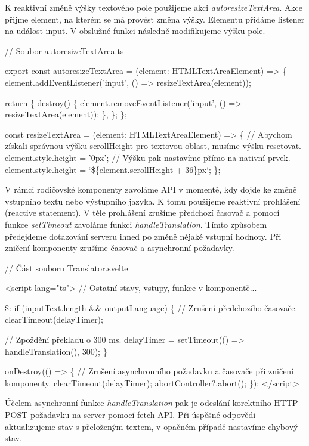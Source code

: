 K reaktivní změně výšky textového pole použijeme akci \emph{autoresizeTextArea}. Akce přijme element, na kterém se má provést změna výšky. Elementu přidáme listener na událost input. 
V obslužné funkci následně modifikujeme výšku pole.

\begin{prog}
// Soubor autoresizeTextArea.ts

export const autoresizeTextArea = (element: HTMLTextAreaElement) => \{
  element.addEventListener('input', () => resizeTextArea(element));

  return \{
    destroy() \{
      element.removeEventListener('input', () => resizeTextArea(element));
    \},
  \};
\};

const resizeTextArea = (element: HTMLTextAreaElement) => \{
  // Abychom získali správnou výšku scrollHeight 
    pro textovou oblast, musíme výšku resetovat.
  element.style.height = '0px';
  // Výšku pak nastavíme přímo na nativní prvek.
  element.style.height = `\$\{element.scrollHeight + 36\}px`;
\};
\end{prog}

V rámci rodičovské komponenty zavoláme API v momentě, kdy dojde ke změně vstupního textu nebo výstupního jazyka. K tomu použijeme reaktivní prohlášení (reactive statement). 
V těle prohlášení zrušíme předchozí časovač a pomocí funkce \emph{setTimeout} zavoláme funkci \emph{handleTranslation}. Tímto způsobem předejdeme dotazování serveru ihned po změně nějaké vstupní hodnoty. 
Při zničení komponenty zrušíme časovač a asynchronní požadavky.

\begin{prog}
// Část souboru Translator.svelte

<script lang="ts">
  // Ostatní stavy, vstupy, funkce v komponentě...
  
  \$: if (inputText.length && outputLanguage) \{
    // Zrušení předchozího časovače.
    clearTimeout(delayTimer);

    // Zpoždění překladu o 300 ms.
    delayTimer = setTimeout(() => handleTranslation(), 300);
  \}

  onDestroy(() => \{
    // Zrušení asynchronního požadavku a časovače při zničení komponenty.
    clearTimeout(delayTimer);
    abortController?.abort();
  \});
</script>
\end{prog}

Účelem asynchronní funkce \emph{handleTranslation} pak je odeslání korektního HTTP POST požadavku na server pomocí fetch API. 
Při úspěšné odpovědi aktualizujeme stav s přeloženým textem, v opačném případě nastavíme chybový stav.

